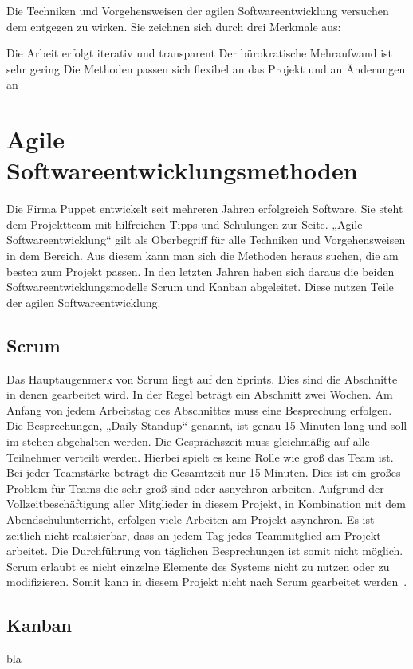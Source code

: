 Die Techniken und Vorgehensweisen der agilen Softwareentwicklung versuchen dem
entgegen zu wirken. Sie zeichnen sich durch drei Merkmale aus:

\begin{outline}
  \1 Die Arbeit erfolgt iterativ und transparent
  \1 Der bürokratische Mehraufwand ist sehr gering
  \1 Die Methoden passen sich flexibel an das Projekt und an Änderungen an
\end{outline}

\section{Agile Softwareentwicklungsmethoden}
Die Firma Puppet entwickelt seit mehreren Jahren erfolgreich Software. Sie
steht dem Projektteam mit hilfreichen Tipps und Schulungen zur Seite. „Agile
Softwareentwicklung“ gilt als Oberbegriff für alle Techniken und
Vorgehensweisen in dem Bereich. Aus diesem kann man sich die Methoden heraus
suchen, die am besten zum Projekt passen. In den letzten Jahren haben sich
daraus die beiden Softwareentwicklungsmodelle Scrum und Kanban abgeleitet.
Diese nutzen Teile der agilen Softwareentwicklung.
\tm%

\subsection{Scrum}
Das Hauptaugenmerk von Scrum liegt auf den Sprints. Dies sind die Abschnitte in
denen gearbeitet wird. In der Regel beträgt ein Abschnitt zwei Wochen. Am
Anfang von jedem Arbeitstag des Abschnittes muss eine Besprechung erfolgen. Die
Besprechungen, „Daily Standup“ genannt, ist genau 15 Minuten lang und soll im
stehen abgehalten werden. Die Gesprächszeit muss gleichmäßig auf alle
Teilnehmer verteilt werden. Hierbei spielt es keine Rolle wie groß das Team
ist. Bei jeder Teamstärke beträgt die Gesamtzeit nur 15 Minuten. Dies ist ein
großes Problem für Teams die sehr groß sind oder asnychron arbeiten. Aufgrund
der Vollzeitbeschäftigung aller Mitglieder in diesem Projekt, in Kombination
mit dem Abendschulunterricht, erfolgen viele Arbeiten am Projekt asynchron. Es
ist zeitlich nicht realisierbar, dass an jedem Tag jedes Teammitglied am
Projekt arbeitet. Die Durchführung von täglichen Besprechungen ist somit nicht
möglich. Scrum erlaubt es nicht einzelne Elemente des Systems nicht zu nutzen
oder zu modifizieren. Somit kann in diesem Projekt nicht nach Scrum gearbeitet
werden~\cite{scrum_talk}.
\tm%

\subsection{Kanban}
bla
\tm%

